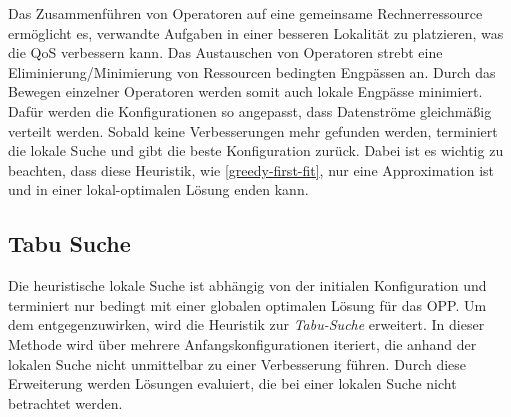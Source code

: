 \documentclass{article}
\begin{document}
Das Zusammenführen von Operatoren auf eine gemeinsame Rechnerressource ermöglicht es, verwandte Aufgaben in einer besseren Lokalität zu platzieren, 
was die QoS verbessern kann. 
Das Austauschen von Operatoren strebt eine Eliminierung/Minimierung von Ressourcen bedingten Engpässen an. 
Durch das Bewegen einzelner Operatoren werden somit auch lokale Engpässe minimiert. 
Dafür werden die Konfigurationen so angepasst, dass Datenströme gleichmäßig verteilt werden. 
Sobald keine Verbesserungen mehr gefunden werden, terminiert die lokale Suche und gibt die beste Konfiguration zurück. 
Dabei ist es wichtig zu beachten, dass diese Heuristik, wie \ref{greedy-first-fit}, nur eine Approximation ist und in einer lokal-optimalen Lösung enden kann.

 

\subsection{Tabu Suche}
Die heuristische lokale Suche ist abhängig von der initialen Konfiguration und terminiert nur bedingt 
mit einer globalen optimalen Lösung für das OPP. Um dem entgegenzuwirken, 
wird die Heuristik zur \textit{Tabu-Suche} \cite{glover-tabu-search} erweitert. 
In dieser Methode wird über mehrere Anfangskonfigurationen iteriert, die anhand der lokalen Suche nicht unmittelbar zu einer Verbesserung führen. 
Durch diese Erweiterung werden Lösungen evaluiert, die bei einer lokalen Suche nicht betrachtet werden.
\end{document}
